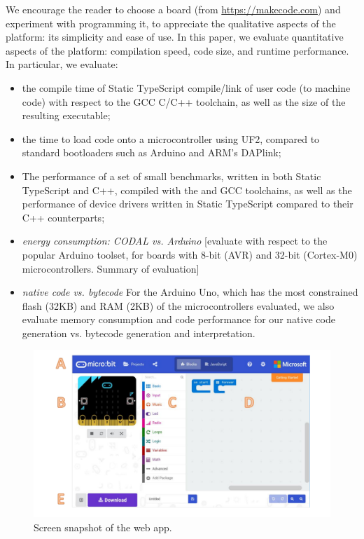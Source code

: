 We encourage the reader to choose a board (from \url{https://makecode.com})
and experiment with programming it, to appreciate the 
qualitative aspects of the platform: its simplicity and ease of use.  In this 
paper, we evaluate quantitative aspects of the platform: 
compilation speed, code size, and runtime performance.  In particular, we evaluate:
\begin{itemize}
\item the compile time of Static TypeScript compile/link of user code (to machine code) with respect 
      to the GCC C/C++ toolchain, as well as the size of the resulting executable;
\item the time to load code onto a microcontroller using UF2, compared to standard bootloaders
      such as Arduino and ARM's DAPlink; 
\item The performance of a set of small benchmarks, written in both Static TypeScript and C++,
      compiled with the \MC and GCC toolchains, as well as the performance of device drivers
      written in Static TypeScript compared to their C++ counterparts;
\item \emph{energy consumption: CODAL vs. Arduino}
[evaluate with respect to the popular Arduino toolset, for boards with 8-bit (AVR) and 32-bit (Cortex-M0) microcontrollers. 
Summary of evaluation]
\item \emph{native code vs. bytecode} For the Arduino Uno, which has the most constrained flash (32KB) and RAM (2KB) of the microcontrollers evaluated, we also
evaluate memory consumption and code performance for our native code generation vs. bytecode generation and interpretation. 
\end{itemize}


\begin{figure}[t]
      \includegraphics[width=5in]{screenSnapFig.pdf}
  \caption{\label{fig:screenSnap}Screen snapshot of the \MC web app.}
\end{figure}

